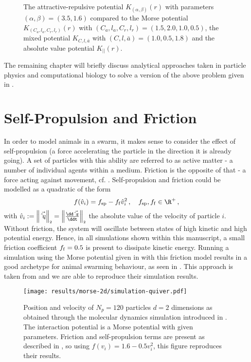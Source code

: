 \begin{figure}[H]
  \centering
  \caption[Comparing potentials]{The attractive-repulsive potential $K_{(\alpha,\beta)}(r)$ with parameters $(\alpha,\beta) = (3.5, 1.6)$ compared to the Morse potential $K_{(C_a, l_a, C_r, l_r)}(r)$ with $(C_a, l_a, C_r, l_r) = (1.5, 2.0, 1.0, 0.5)$, the mixed potential $K_{C, l, \bar{a}}$ with $(C, l, \bar{a}) = (1.0, 0.5, 1.8)$ and the absolute value potential $K_{||}(r)$.}
  \label{fig:comparing-potentials}
\end{figure}

The remaining chapter will briefly discuss analytical approaches taken in particle physics and computational biology to solve a version of the above problem given in .

\section{Self-Propulsion and Friction}
\label{sec:self-propulsion-friction}
In order to model animals in a swarm, it makes sense to consider the effect of self-propulsion (a force accelerating the particle in the direction it is already going).
A set of particles with this ability are referred to as active matter - a number of individual agents within a medium.
Friction is the opposite of that - a force acting against movement, cf. .
Self-propulsion and friction could be modelled as a quadratic of the form
$$f(\hat{v}_i) = f_{\rm sp} - f_{\rm f} \hat{v}_i^2\,,\quad f_{\rm sp}, f_{\rm f} \in \R^+\,,$$
with $\hat{v}_i := \norm{\vec{\hat{v}_i}} = \norm{\frac{\dd\vec{\hat{x}_i}}{\ddt}}$ the absolute value of the velocity of particle $i$.
Without friction, the system will oscillate between states of high kinetic and high potential energy.
Hence, in all simulations shown within this manuscript, a small friction coefficient $f_{\rm f} = 0.5$ is present to dissipate kinetic energy.
Running a simulation using the Morse potential given in  with this friction model results in a good archetype for animal swarming behaviour, as seen in .
This approach is taken from \cite{2006-self-propelled} and we are able to reproduce their simulation results.

\begin{figure}[H]
  \centering
  \texttt{[image: results/morse-2d/simulation-quiver.pdf]}
  \caption[Quiver plot of 120 particles in 2D interacting through the Morse potential]{Position and velocity of $N_p = 120$ particles $d = 2$ dimensions as obtained through the molecular dynamics simulation introduced in . The interaction potential is a Morse potential with given parameters. Friction and self-propulsion terms are present as described in \cite{2006-self-propelled}, so using $f(v_i) = 1.6 - 0.5 v_i^2$, this figure reproduces their results.}
  \label{fig:simulation-quiver-illustration}
\end{figure}

